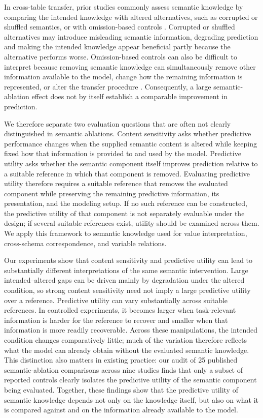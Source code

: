 \documentclass{article} %
\begin{document}
In cross-table transfer, prior studies commonly assess semantic knowledge by comparing the intended knowledge with altered alternatives, such as corrupted or shuffled semantics, or with omission-based controls \citep{dinh2022lift,hegselmann2023tabllm}.
Corrupted or shuffled alternatives may introduce misleading semantic information, degrading prediction and making the intended knowledge appear beneficial partly because the alternative performs worse.
Omission-based controls can also be difficult to interpret because removing semantic knowledge can simultaneously remove other information available to the model, change how the remaining information is represented, or alter the transfer procedure \citep{hewitt2019designing,elazar2021amnesic,sturmfels2020visualizing}.
Consequently, a large semantic-ablation effect does not by itself establish a comparable improvement in prediction.

We therefore separate two evaluation questions that are often not clearly distinguished in semantic ablations.
Content sensitivity asks whether predictive performance changes when the supplied semantic content is altered while keeping fixed how that information is provided to and used by the model. 
Predictive utility asks whether the semantic component itself improves prediction relative to a suitable reference in which that component is removed.
Evaluating predictive utility therefore requires a suitable reference that removes the evaluated component while preserving the remaining predictive information, its presentation, and the modeling setup.
If no such reference can be constructed, the predictive utility of that component is not separately evaluable under the design; if several suitable references exist, utility should be examined across them.
We apply this framework to semantic knowledge used for value interpretation, cross-schema correspondence, and variable relations.

Our experiments show that content sensitivity and predictive utility can lead to substantially different interpretations of the same semantic intervention.
Large intended–altered gaps can be driven mainly by degradation under the altered condition, so strong content sensitivity need not imply a large predictive utility over a reference.
Predictive utility can vary substantially across suitable references. 
In controlled experiments, it becomes larger when task-relevant information is harder for the reference to recover and smaller when that information is more readily recoverable.
Across these manipulations, the intended condition changes comparatively little; much of the variation therefore reflects what the model can already obtain without the evaluated semantic knowledge.
This distinction also matters in existing practice: our audit of 25 published semantic-ablation comparisons across nine studies finds that only a subset of reported controls clearly isolates the predictive utility of the semantic component being evaluated.
Together, these findings show that the predictive utility of semantic knowledge depends not only on the knowledge itself, but also on what it is compared against and on the information already available to the model.
\end{document}
